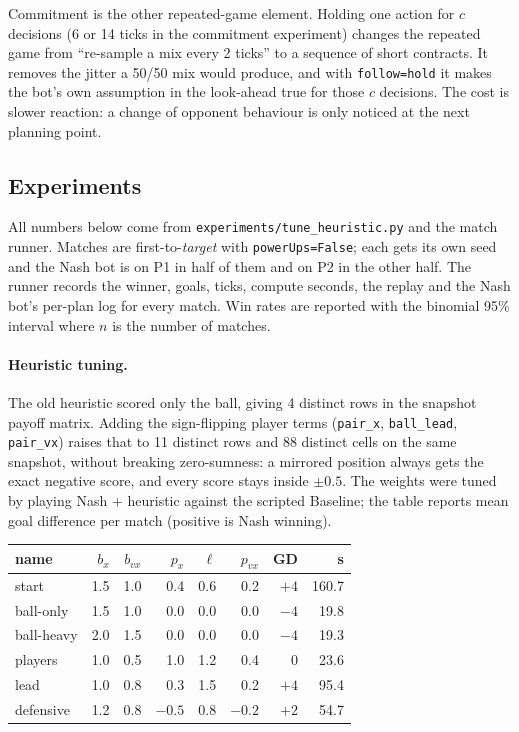 Commitment is the other repeated-game element. Holding one action for $c$
decisions (6 or 14 ticks in the commitment experiment) changes the repeated
game from ``re-sample a mix every 2 ticks'' to a sequence of short contracts.
It removes the jitter a 50/50 mix would produce, and with \texttt{follow=hold}
it makes the bot's own assumption in the look-ahead true for those $c$
decisions. The cost is slower reaction: a change of opponent behaviour is only
noticed at the next planning point.

\subsection{Experiments}

All numbers below come from \texttt{experiments/tune\_heuristic.py} and the
match runner. Matches are first-to-\emph{target} with \texttt{powerUps=False};
each gets its own seed and the Nash bot is on P1 in half of them and on P2 in
the other half. The runner records the winner, goals, ticks, compute seconds,
the replay and the Nash bot's per-plan log for every match. Win rates are
reported with the binomial 95\% interval where $n$ is the number of matches.

\paragraph{Heuristic tuning.}
The old heuristic scored only the ball, giving 4 distinct rows in the
snapshot payoff matrix. Adding the sign-flipping player terms
(\texttt{pair\_x}, \texttt{ball\_lead}, \texttt{pair\_vx}) raises that to 11
distinct rows and 88 distinct cells on the same snapshot, without breaking
zero-sumness: a mirrored position always gets the exact negative score, and
every score stays inside $\pm 0.5$. The weights were tuned by playing
Nash + heuristic against the scripted Baseline; the table reports mean goal
difference per match (positive is Nash winning).

\begin{center}
\begin{tabular}{l|rrrrr|rr}
\hline
name & $b_x$ & $b_{vx}$ & $p_x$ & $\ell$ & $p_{vx}$ & GD & s \\
\hline
start      & 1.5 & 1.0 &  0.4 & 0.6 &  0.2 & $+4$ & 160.7 \\
ball-only  & 1.5 & 1.0 &  0.0 & 0.0 &  0.0 & $-4$ &  19.8 \\
ball-heavy & 2.0 & 1.5 &  0.0 & 0.0 &  0.0 & $-4$ &  19.3 \\
players    & 1.0 & 0.5 &  1.0 & 1.2 &  0.4 & $0$  &  23.6 \\
lead       & 1.0 & 0.8 &  0.3 & 1.5 &  0.2 & $+4$ &  95.4 \\
defensive  & 1.2 & 0.8 & $-0.5$ & 0.8 & $-0.2$ & $+2$ &  54.7 \\
\hline
\end{tabular}
\end{center}

